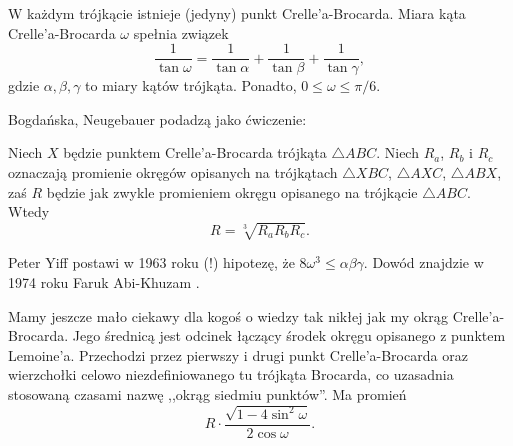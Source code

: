 \begin{proposition}
    W każdym trójkącie istnieje (jedyny) punkt Crelle'a-Brocarda.
    Miara kąta Crelle'a-Brocarda $\omega$ spełnia związek
    \begin{equation}
        \frac 1 {\tan \omega} = \frac 1 {\tan \alpha} + \frac 1 {\tan \beta} + \frac 1 {\tan \gamma},
    \end{equation}
    gdzie $\alpha, \beta, \gamma$ to miary kątów trójkąta.
    Ponadto, $0 \le \omega \le \pi/6$.
\end{proposition}

Bogdańska, Neugebauer \cite[s. 100]{neugebauer_2018} podadzą jako ćwiczenie:

\begin{proposition}
    Niech $X$ będzie punktem Crelle'a-Brocarda trójkąta $\triangle ABC$.
    Niech $R_a$, $R_b$ i $R_c$ oznaczają promienie okręgów opisanych na trójkątach $\triangle XBC$, $\triangle AXC$, $\triangle ABX$, zaś $R$ będzie jak zwykle promieniem okręgu opisanego na trójkącie $\triangle ABC$.
    Wtedy
    \begin{equation}
        R = \sqrt[3]{R_a R_b R_c}.
    \end{equation}
\end{proposition}

Peter Yiff \cite{yff_1963} postawi w 1963 roku (!) hipotezę, że $8 \omega^3 \le \alpha \beta \gamma$.
%
Dowód znajdzie w 1974 roku Faruk Abi-Khuzam \cite{abikhuzam_1974}.
%

Mamy jeszcze mało ciekawy dla kogoś o wiedzy tak nikłej jak my okrąg Crelle'a-Brocarda.
%
Jego średnicą jest odcinek łączący środek okręgu opisanego z punktem Lemoine'a.
%
%
Przechodzi przez pierwszy i drugi punkt Crelle'a-Brocarda oraz wierzchołki celowo niezdefiniowanego tu trójkąta Brocarda, co uzasadnia stosowaną czasami nazwę ,,okrąg siedmiu punktów''.
%
Ma promień
\begin{equation}
    R \cdot \frac{\sqrt{1 - 4 \sin^2 \omega}}{2 \cos \omega}.
\end{equation}

%